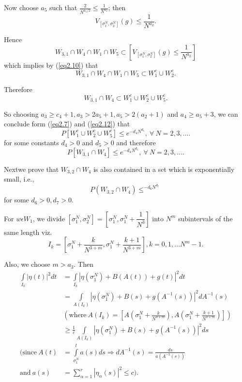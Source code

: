 Now choose $a_5$ such that $\frac{2}{N^{a_{5}/2}} \leq \frac{1}{N^{a_{2}}}$; then 
$$
V_{[\sigma_{1}^{N}, \sigma_{2}^{N}]}(g) \leq \frac{1}{N^{a_{2}}}.
$$

Hence
$$
W_{3, 1} \cap W_4 \cap W_1 \cap W_5 \subset
\left[V_{[\sigma_{1}^{N},\sigma_{2}^{N}]}(g) \leq \frac{1}{N^{a_{2}}}\right] 
$$
which implies by (\ref{eq2.10}) that 
$$
W_{3, 1 } \cap W_4 \cap W_1 \cap W_5 \subset W_1^c \cup W_2 ^c.
$$

Therefore
$$
W_{3, 1} \cap W_4 \subset W_1^c \cup W_2^c \cup W_5^c.
$$

So choosing $a_3 \geq c_4 + 1, a_3 > 2a_5 + 1, a_5 > 2 (a_2 + 1) $ and
$a_4 \geq a_5 + 3$,  we can  conclude form (\ref{eq2.7}) and
(\ref{eq2.12}) that  
$$
P\left[W_1^c \cup W_2^c \cup   W_5^c\right] \leq e^{-d_{4}N^{d_5}},
~\forall~ N = 2, 3, \ldots. 
$$
for  some constants $d_4 > 0 $ and $d_5 > 0 $ and therefore
\begin{equation*}
  P\left[W_{3, 1} \cap W_4 \right] \leq e^{-d_{4}N^{d_{5}}}, ~\forall~ N
  = 2, 3, \ldots.\tag{2.13} \label{eq2.13} 
\end{equation*}

Next\pageoriginale we  prove that $W_{3, 2} \cap W_4 $ is also
contained  in a set which is exponentially small, i.e.,  
$$
P(W_{3, 2} \cap W_4)  \leq ^{-d_{6}N^{d_{7}}}
$$
for some $d_6 > 0, d_7 > 0$.

 For $  w \epsilon  W_1$, we divide $\left[ \sigma_{1}^{N},
   \sigma_{2}^{N}\right] = \left[\sigma_{1}^{N}, \sigma_{1}^{N} +
   \dfrac{1}{N^3}\right]$ into $N^m$ subintervals of the same length
 viz.  
$$
I_k = \left[\sigma_{1}^{N} + \frac{k}{N^{3 + m}}, \sigma_{1}^{N} +
  \frac{k+1}{N^{3 + m}}\right],  k = 0, 1, \ldots N^m -1. 
$$
 
 Also, we choose $m > a_3$. Then
 \begin{align*}
   \int\limits_{I_{k}} | \eta (t) |^2 dt &= \int\limits_{I_{k}} | \eta
   (\sigma_{1}^{N}) + B(A (t)) + g(t)|^2 dt \tag{2.14}\label{eq2.14}\\ 
   &= \int\limits_{A(I_{k})}| \eta (\sigma_{1}^{N}) + B(s) +
   g(A^{-1}(s)) |^2 dA ^{-1}(s)\\ 
   &\left(\text{where}~ A(I_{k}) = \left[A\left(\sigma_{1}^{N} +
     \frac{k}{N^{3 + m}}\right), A\left(\sigma_{1}^{N} +
     \frac{k+1}{N^{3+m}}\right) \right]\right)\\ 
   &\geq \frac{1}{c} \int\limits_{A(I_{k})}| \eta (\sigma_{1}^{N} ) + B(s) +
   g(A^{-1}(s)) |^2 ds\\
   (\text{since}~ A(t)&= \int\limits_{\sigma_{1}^{N}}^{t} a(s) ds \Rightarrow
   dA^{-1}(s) = \frac{ds}{a (A^{-1}(s))}\\ 
   \text{and}~ a(s) &= \sum_{\alpha =1}^{r} | \eta _{\alpha } (s) |^2 \leq c). 
 \end{align*}


